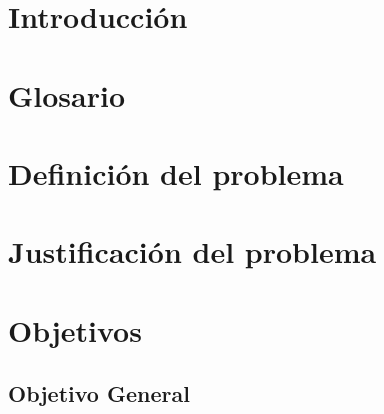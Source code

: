 \documentclass[letter,12pt]{book}
\begin{document}
  \newpage
  \mbox{}
  \thispagestyle{empty} %
  
  \tableofcontents %

  \cleardoublepage
  \listoffigures %

  \cleardoublepage
  \listoftables %
  
  
  \chapter*{Introducción} %
  
  
  \chapter*{Glosario}
  
  
  \chapter{Definición del problema}
  \label{chap:definicion_problema}
  
  
  \chapter{Justificación del problema}
  \label{chap:justificacion}
  
  
  \chapter{Objetivos}
  \label{chap:objetivos}
  \section{Objetivo General}
   
\end{document}
